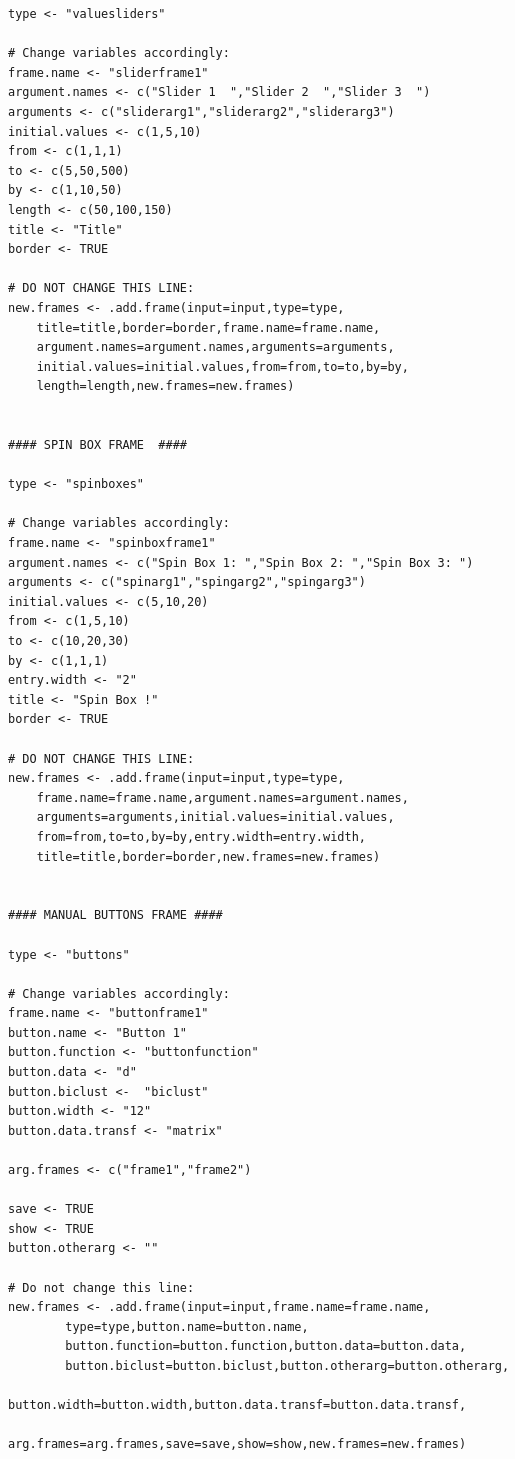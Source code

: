 \documentclass[a4paper]{article}\usepackage[]{graphicx}\usepackage[]{color}
\begin{document}
\begin{verbatim}
type <- "valuesliders"

# Change variables accordingly:
frame.name <- "sliderframe1"
argument.names <- c("Slider 1  ","Slider 2  ","Slider 3  ")
arguments <- c("sliderarg1","sliderarg2","sliderarg3") 
initial.values <- c(1,5,10)
from <- c(1,1,1) 
to <- c(5,50,500) 
by <- c(1,10,50)  
length <- c(50,100,150) 
title <- "Title"
border <- TRUE

# DO NOT CHANGE THIS LINE:
new.frames <- .add.frame(input=input,type=type,
    title=title,border=border,frame.name=frame.name,
    argument.names=argument.names,arguments=arguments,
    initial.values=initial.values,from=from,to=to,by=by,
    length=length,new.frames=new.frames)


#### SPIN BOX FRAME  ####

type <- "spinboxes"

# Change variables accordingly:
frame.name <- "spinboxframe1"
argument.names <- c("Spin Box 1: ","Spin Box 2: ","Spin Box 3: ") 
arguments <- c("spinarg1","spingarg2","spingarg3") 
initial.values <- c(5,10,20)
from <- c(1,5,10)  
to <- c(10,20,30)
by <- c(1,1,1)
entry.width <- "2"  
title <- "Spin Box !"
border <- TRUE

# DO NOT CHANGE THIS LINE:
new.frames <- .add.frame(input=input,type=type,
    frame.name=frame.name,argument.names=argument.names,
    arguments=arguments,initial.values=initial.values,
    from=from,to=to,by=by,entry.width=entry.width,
    title=title,border=border,new.frames=new.frames)


#### MANUAL BUTTONS FRAME ####

type <- "buttons"

# Change variables accordingly:
frame.name <- "buttonframe1"  
button.name <- "Button 1"  
button.function <- "buttonfunction" 
button.data <- "d" 
button.biclust <-  "biclust" 
button.width <- "12"
button.data.transf <- "matrix"

arg.frames <- c("frame1","frame2")

save <- TRUE 
show <- TRUE
button.otherarg <- "" 

# Do not change this line: 
new.frames <- .add.frame(input=input,frame.name=frame.name,
		type=type,button.name=button.name,
		button.function=button.function,button.data=button.data,
		button.biclust=button.biclust,button.otherarg=button.otherarg,
		button.width=button.width,button.data.transf=button.data.transf,
		arg.frames=arg.frames,save=save,show=show,new.frames=new.frames)


\end{verbatim}
\end{document}
